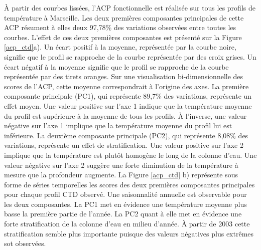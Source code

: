 \documentclass[12pt]{article}
\begin{document}
À partir des courbes lissées, l’ACP fonctionnelle est réalisée sur tous les profils de température à Marseille.  Les deux premières composantes principales de cette ACP résument à elles deux 97,78\% des variations observées entre toutes les courbes. L’effet de ces deux premières composantes est présenté sur la Figure \ref{acp_ctd}a). Un écart positif à la moyenne, représentée par la courbe noire, signifie que le profil se rapproche de la courbe représentée par des croix grises. Un écart négatif à la moyenne signifie que le profil se rapproche de la courbe représentée par des tirets oranges. Sur une visualisation bi-dimensionnelle des scores de l’ACP, cette moyenne correspondrait à l’origine des axes. La première composante principale (PC1), qui représente 89,7\% des variations, représente un effet moyen. Une valeur positive sur l’axe 1 indique que la température moyenne du profil est supérieure à la moyenne de tous les profils. À l’inverse, une valeur négative sur l’axe 1 implique que la température moyenne du profil lui est inférieure. La deuxième composante principale (PC2), qui représente 8,08\% des variations, représente un effet de stratification. Une valeur positive sur l’axe 2 implique que la température est plutôt homogène le long de la colonne d’eau. Une valeur négative sur l’axe 2 suggère une forte diminution de la température à mesure que la profondeur augmente. La Figure \ref{acp_ctd} b) représente sous forme de séries temporelles les scores des deux premières composantes principales pour chaque profil CTD observé. Une saisonnalité annuelle est observable pour les deux composantes. La PC1 met en évidence une température moyenne plus basse la première partie de l’année. La PC2 quant à elle met en évidence une forte stratification de la colonne d’eau en milieu d’année. À partir de 2003 cette stratification semble plus importante puisque des valeurs négatives plus extrêmes sot observées. 
\end{document}
